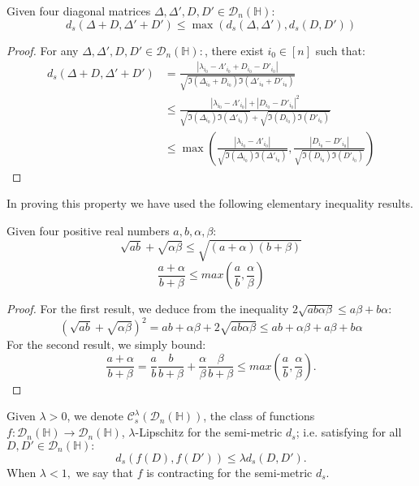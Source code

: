 \documentclass[ECP, preprint]{ejpecp} %
\begin{document}
\begin{lemma}
    Given four diagonal matrices $\Delta,\Delta',D,D'\in \mathcal{D}_n(\mathbb{H}):$
    $$d_s(\Delta+D,\Delta'+D')\leq \max(d_s(\Delta,\Delta'),d_s(D,D'))$$
\end{lemma}
\begin{proof}
    For any $\Delta,\Delta',D,D'\in \mathcal{D}_n(\mathbb{H}):$, there exist $i_0\in [n]$ such that:
    \begin{equation*}
    \begin{split}
    d_s(\Delta+D,\Delta'+D')&=\frac{|\lambda_{i_0}-\Lambda'_{i_0}+D_{i_0}-D'_{i_0}|}{\sqrt{\Im(\Delta_{i_0}+D_{i_0})\Im(\Delta'_{i_0}+D'_{i_0})}}\\
    &\leq \frac{|\lambda_{i_0}-\Lambda'_{i_0}|+|D_{i_0}-D'_{i_0}|^2}{\sqrt{\Im(\Delta_{i_0})\Im(\Delta'_{i_0})}+\sqrt{\Im(D_{i_0})\Im(D'_{i_0})}}\\
    &\leq \max\left( \frac{|\lambda_{i_0}-\Lambda'_{i_0}|}{\sqrt{\Im(\Delta_{i_0})\Im(\Delta'_{i_0})}}, \frac{|D_{i_0}-D'_{i_0}|}{\sqrt{\Im(D_{i_0})\Im(D'_{i_0})}}\right)    
    \end{split}    
    \end{equation*}
\end{proof}

In proving this property we have used the following elementary inequality results.

\begin{lemma}
    Given four positive real numbers $a,b,\alpha,\beta$:
     $$\sqrt{ab}+\sqrt{\alpha \beta}\leq \sqrt{(a+\alpha)(b+\beta)}$$
     $$\frac{a+\alpha}{b+\beta}\leq max(\frac{a}{b},\frac{\alpha}{\beta})$$
\end{lemma}
\begin{proof}
    For the first result, we deduce from the inequality $2\sqrt{ab\alpha\beta}\leq a\beta+b\alpha$:
$$(\sqrt{ab}+\sqrt{\alpha\beta})^2=ab+\alpha\beta+2\sqrt{ab\alpha\beta}\leq ab+\alpha\beta+a\beta+b\alpha$$
For the second result, we simply bound:
$$\frac{a+\alpha}{b+\beta}= \frac{a}{b}\frac{b}{b+\beta}+\frac{\alpha}{\beta}\frac{\beta}{b+\beta}\leq max\left(\frac{a}{b},\frac{\alpha}{\beta}\right).$$
\end{proof}

\begin{definition}
    Given $\lambda>0$, we denote $\mathcal{C}^{\lambda}_s(\mathcal{D}_n(\mathbb{H}))$, the class of functions $f:\mathcal{D}_n(\mathbb{H})\to \mathcal{D}_n(\mathbb{H})$, $\lambda$-Lipschitz for the semi-metric $d_s$; i.e. satisfying for all $D,D'\in \mathcal{D}_n(\mathbb{H}):$
    $$d_s(f(D),f(D'))\leq \lambda d_s(D,D').$$
    When $\lambda<1,$ we say that $f$ is contracting for the semi-metric $d_s$.
\end{definition}
\end{document}
